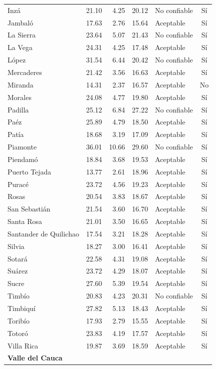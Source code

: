 \begin{longtable}{p{3.4cm} r r r l c}
Inzá & 21.10 & 4.25 & 20.12 & No confiable & Sí \\
Jambaló & 17.63 & 2.76 & 15.64 & Aceptable & Sí \\
La Sierra & 23.64 & 5.07 & 21.43 & No confiable & Sí \\
La Vega & 24.31 & 4.25 & 17.48 & Aceptable & Sí \\
López & 31.54 & 6.44 & 20.42 & No confiable & Sí \\
Mercaderes & 21.42 & 3.56 & 16.63 & Aceptable & Sí \\
Miranda & 14.31 & 2.37 & 16.57 & Aceptable & No \\
Morales & 24.08 & 4.77 & 19.80 & Aceptable & Sí \\
Padilla & 25.12 & 6.84 & 27.22 & No confiable & Sí \\
Paéz & 25.89 & 4.79 & 18.50 & Aceptable & Sí \\
Patía & 18.68 & 3.19 & 17.09 & Aceptable & Sí \\
Piamonte & 36.01 & 10.66 & 29.60 & No confiable & Sí \\
Piendamó & 18.84 & 3.68 & 19.53 & Aceptable & Sí \\
Puerto Tejada & 13.77 & 2.61 & 18.96 & Aceptable & Sí \\
Puracé & 23.72 & 4.56 & 19.23 & Aceptable & Sí \\
Rosas & 20.54 & 3.83 & 18.67 & Aceptable & Sí \\
San Sebastián & 21.54 & 3.60 & 16.70 & Aceptable & Sí \\
Santa Rosa & 21.01 & 3.50 & 16.65 & Aceptable & Sí \\
Santander de Quilichao & 17.54 & 3.21 & 18.28 & Aceptable & Sí \\
Silvia & 18.27 & 3.00 & 16.41 & Aceptable & Sí \\
Sotará & 22.58 & 4.31 & 19.08 & Aceptable & Sí \\
Suárez & 23.72 & 4.29 & 18.07 & Aceptable & Sí \\
Sucre & 27.60 & 5.39 & 19.54 & Aceptable & Sí \\
Timbío & 20.83 & 4.23 & 20.31 & No confiable & Sí \\
Timbiquí & 27.82 & 5.13 & 18.43 & Aceptable & Sí \\
Toribío & 17.93 & 2.79 & 15.55 & Aceptable & Sí \\
Totoró & 23.83 & 4.19 & 17.57 & Aceptable & Sí \\
Villa Rica & 19.87 & 3.69 & 18.59 & Aceptable & Sí \\
\midrule
\multicolumn{6}{l}{\textbf{Valle del Cauca}} \\

\end{longtable}
